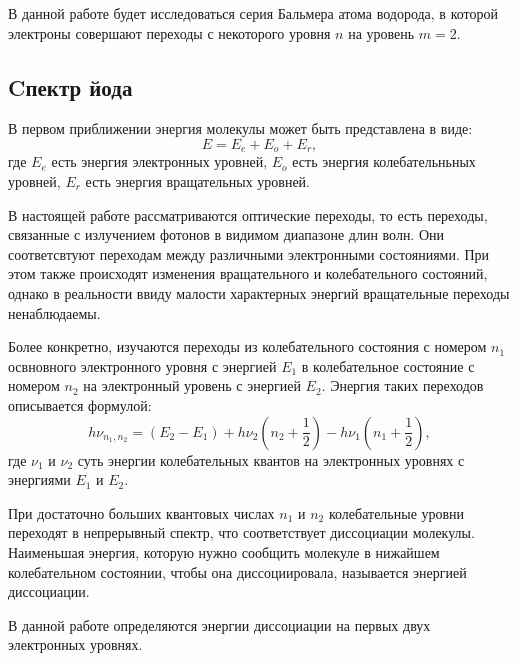 \documentclass[a4paper, 12pt]{article}%
\begin{document}
В данной работе будет исследоваться серия Бальмера атома водорода, в которой электроны совершают переходы с некоторого уровня $n$ на уровень $m = 2$.
\subsection{Cпектр йода}
В первом приближении энергия молекулы может быть представлена в виде:
\begin{equation}
	E=E_e+E_o+E_r,
\end{equation}
где $E_e$ есть энергия электронных уровней, $E_o$ есть энергия колебательньных уровней, $E_r$ есть энергия вращательных уровней.

В настоящей работе рассматриваются оптические переходы, то есть переходы, связанные с излучением фотонов в видимом диапазоне длин волн. Они соответсвтуют переходам между различными электронными состояниями. При этом также происходят изменения вращательного и колебательного состояний, однако в реальности ввиду малости характерных энергий вращательные переходы ненаблюдаемы.

Более конкретно, изучаются переходы из колебательного состояния с номером $n_1$ освновного электронного уровня с энергией $E_1$ в колебательное состояние с номером $n_2$ на электронный уровень с энергией $E_2$. Энергия таких переходов описывается формулой:
\begin{equation}\label{iod}
	h \nu_{n_1,n_2}=(E_2-E_1)+h\nu_2(n_2+\dfrac{1}{2})-h \nu_1(n_1+\dfrac{1}{2}),
\end{equation}
где $\nu_1$ и $\nu_2$ суть энергии колебательных квантов на электронных уровнях с энергиями $E_1$ и $E_2$.

При достаточно больших квантовых числах $n_1$ и $n_2$ колебательные уровни переходят в непрерывный спектр, что соответствует диссоциации молекулы. Наименьшая энергия, которую нужно сообщить молекуле в нижайшем колебательном состоянии, чтобы она диссоциировала, называется энергией диссоциации.

В данной работе определяются энергии диссоциации на первых двух электронных уровнях.
	
\end{document}
